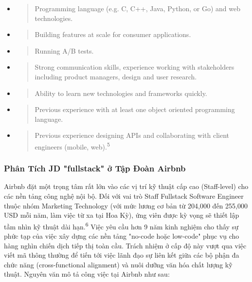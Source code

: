 \documentclass[12pt,a4paper]{article}
\begin{document}
\begin{itemize}
\item
  \begin{quote}
  Programming language (e.g. C, C++, Java, Python, or Go) and web
  technologies.
  \end{quote}
\item
  \begin{quote}
  Building features at scale for consumer applications.
  \end{quote}
\item
  \begin{quote}
  Running A/B tests.
  \end{quote}
\item
  \begin{quote}
  Strong communication skills, experience working with stakeholders
  including product managers, design and user research.
  \end{quote}
\item
  \begin{quote}
  Ability to learn new technologies and frameworks quickly.
  \end{quote}
\item
  \begin{quote}
  Previous experience with at least one object oriented programming
  language.
  \end{quote}
\item
  \begin{quote}
  Previous experience designing APIs and collaborating with client
  engineers (mobile, web).\textsuperscript{5}
  \end{quote}
\end{itemize}

\subsubsection{Phân Tích JD "fullstack" ở Tập Đoàn Airbnb}

Airbnb đặt một trọng tâm rất lớn vào các vị trí kỹ thuật cấp cao
(Staff-level) cho các nền tảng công nghệ nội bộ. Đối với vai trò Staff
Fullstack Software Engineer thuộc nhóm Marketing Technology (với mức
lương cơ bản từ 204,000 đến 255,000 USD mỗi năm, làm việc từ xa tại Hoa
Kỳ), ứng viên được kỳ vọng sẽ thiết lập tầm nhìn kỹ thuật dài
hạn.\textsuperscript{6} Việc yêu cầu hơn 9 năm kinh nghiệm cho thấy sự
phức tạp của việc xây dựng các nền tảng "no-code hoặc low-code" phục vụ
cho hàng nghìn chiến dịch tiếp thị toàn cầu. Trách nhiệm ở cấp độ này
vượt qua việc viết mã thông thường để tiến tới việc lãnh đạo sự liên kết
giữa các bộ phận đa chức năng (cross-functional alignment) và nuôi dưỡng
văn hóa chất lượng kỹ thuật. Nguyên văn mô tả công việc tại Airbnb như sau:
\end{document}
